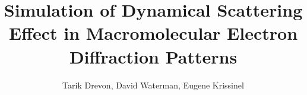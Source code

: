 \documentclass[a4paper,10pt]{article}
\newcommand{\path}{../../../../mygit/_Latex/}
\begin{document}
\title{Simulation of Dynamical Scattering Effect in Macromolecular Electron Diffraction Patterns}
\author{Tarik Drevon, David Waterman, Eugene Krissinel}

\maketitle
{}
\tableofcontents


\newpage

\newpage

\newpage



\newpage


\end{document}
